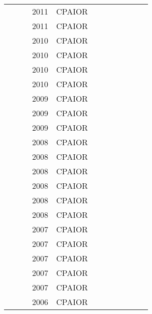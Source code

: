 \documentclass[a4paper]{article}
\begin{document}
{\begin{longtable}{p{3cm}p{6cm}rrcrlcccp{1.5cm}l}
& \href{papers/LombardiBMB11.pdf}{} & \cite{LombardiBMB11} & 2011 & CPAIOR & & & & & & & \\
& \href{papers/Vilim11.pdf}{} & \cite{Vilim11} & 2011 & CPAIOR & & & & & & & \\
& \href{papers/CobanH10.pdf}{} & \cite{CobanH10} & 2010 & CPAIOR & & & & & & & \\
& \href{papers/Davenport10.pdf}{} & \cite{Davenport10} & 2010 & CPAIOR & & & & & & & \\
& \href{papers/GrimesH10.pdf}{} & \cite{GrimesH10} & 2010 & CPAIOR & & & & & & & \\
& \href{papers/BertholdHLMS10.pdf}{} & \cite{BertholdHLMS10} & 2010 & CPAIOR & & & & & & & \\
& \href{papers/Laborie09.pdf}{} & \cite{Laborie09} & 2009 & CPAIOR & & & & & & & \\
& \href{papers/cpaior-Vilim09.pdf}{} & \cite{cpaior-Vilim09} & 2009 & CPAIOR & & & & & & & \\
& \href{papers/Acuna-AgostMFG09.pdf}{} & \cite{Acuna-AgostMFG09} & 2009 & CPAIOR & & & & & & & \\
& \href{papers/BeldiceanuCP08.pdf}{} & \cite{BeldiceanuCP08} & 2008 & CPAIOR & & & & & & & \\
& \href{papers/DoomsH08.pdf}{} & \cite{DoomsH08} & 2008 & CPAIOR & & & & & & & \\
& \href{papers/WatsonB08.pdf}{} & \cite{WatsonB08} & 2008 & CPAIOR & & & & & & & \\
& \href{papers/BarlattCG08.pdf}{} & \cite{BarlattCG08} & 2008 & CPAIOR & & & & & & & \\
& \href{papers/LauLN08.pdf}{} & \cite{LauLN08} & 2008 & CPAIOR & & & & & & & \\
& \href{papers/HentenryckM08.pdf}{} & \cite{HentenryckM08} & 2008 & CPAIOR & & & & & & & \\
& \href{papers/KeriK07.pdf}{} & \cite{KeriK07} & 2007 & CPAIOR & & & & & & & \\
& \href{papers/MonetteDD07.pdf}{} & \cite{MonetteDD07} & 2007 & CPAIOR & & & & & & & \\
& \href{papers/BeldiceanuP07.pdf}{} & \cite{BeldiceanuP07} & 2007 & CPAIOR & & & & & & & \\
& \href{papers/RossiTHP07.pdf}{} & \cite{RossiTHP07} & 2007 & CPAIOR & & & & & & & \\
& \href{papers/AkkerDH07.pdf}{} & \cite{AkkerDH07} & 2007 & CPAIOR & & & & & & & \\
& \href{papers/BeniniBGM06.pdf}{} & \cite{BeniniBGM06} & 2006 & CPAIOR & & & & & & & \\

\end{longtable}}
\end{document}
